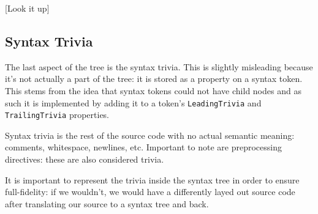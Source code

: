 [Look it up]

\subsection{Syntax Trivia}
\label{sec:syntax-trivia}

The last aspect of the tree is the syntax trivia. This is slightly misleading because it's not actually a part of the tree: it is stored as a property on a syntax token. This stems from the idea that syntax tokens could not have child nodes and as such it is implemented by adding it to a token's \verb|LeadingTrivia| and \verb|TrailingTrivia| properties. 

Syntax trivia is the rest of the source code with no actual semantic meaning: comments, whitespace, newlines, etc. Important to note are preprocessing directives: these are also considered trivia.

It is important to represent the trivia inside the syntax tree in order to ensure full-fidelity: if we wouldn't, we would have a differently layed out source code after translating our source to a syntax tree and back.




